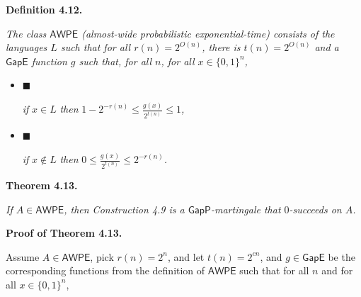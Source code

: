 \documentclass[10pt,a4paper]{article}
\begin{document}


\par\medskip\noindent\textbf{
\textbf{Definition 4.12}\textbf{.}
}\par



\emph{The class $\mathsf{AWPE}$ (almost-wide probabilistic exponential-time) consists of
the languages $L$ such that for all $r(n)=2^{O(n)}$, there is $t(n)=2^{O(n)}$ and a $\mathsf{GapE}$
function $g$ such that, for all $n$, for all $x\in\{0,1\}^{n}$,}\par


\begin{itemize}


\item[] 
$\blacksquare$ 


\emph{if }$x\in L$\emph{ then }$1-2^{-r(n)}\leq\frac{g(x)}{2^{t(n)}}\leq 1$\emph{,}\par





\item[] 
$\blacksquare$ 


\emph{if }$x\not\in L$\emph{ then }$0\leq\frac{g(x)}{2^{t(n)}}\leq 2^{-r(n)}$\emph{.}\par





\end{itemize}







\par\medskip\noindent\textbf{
\textbf{Theorem 4.13}\textbf{.}
}\par



\emph{If $A\in\mathsf{AWPE}$, then Construction 4.9 is a $\mathsf{GapP}$-martingale that $0$-succeeds on $A$.}\par







\par\medskip\noindent\textbf{Proof of Theorem 4.13.}\par




Assume $A\in\mathsf{AWPE}$, pick $r(n)=2^{n}$, and let $t(n)=2^{cn}$, and $g\in\mathsf{GapE}$ be the corresponding functions from the definition of $\mathsf{AWPE}$ such that for all $n$ and for all $x\in\{0,1\}^{n}$,\par
\end{document}
